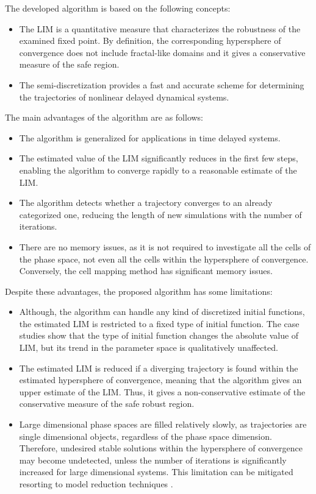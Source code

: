 \documentclass[preprint,12pt]{elsarticle}
\begin{document}
	The developed algorithm is based on the following concepts:  
	\begin{itemize}
		\item The LIM is a quantitative measure that characterizes the robustness of the examined fixed point. By definition, the corresponding hypersphere of convergence does not include fractal-like domains and it gives a conservative  measure of the safe region.
		\item The semi-discretization provides a fast and accurate scheme for determining the trajectories of nonlinear delayed dynamical systems.
	\end{itemize}
	
	The main advantages of the algorithm are as follows:
	\begin{itemize}
		\item The algorithm is generalized for applications in time delayed systems. 
		\item The estimated value of the LIM significantly reduces  in the first few steps, enabling the algorithm to converge rapidly to a reasonable estimate of the LIM.
		\item The algorithm detects whether a trajectory converges to an already categorized one, reducing the length of new simulations with the number of iterations.
		\item There are no memory issues, as it is not required to investigate all the cells of the phase space, not even all the cells within the hypersphere of convergence. Conversely, the cell mapping method has significant memory issues.
	\end{itemize}
	Despite these advantages, the proposed algorithm has some limitations:
	\begin{itemize}
		\item Although, the algorithm can handle any kind of discretized initial functions, the estimated LIM is restricted to a fixed type of initial function.  The case studies show that the type of initial function changes the absolute value of LIM, but its trend in the parameter space is qualitatively unaffected.
		\item The estimated LIM is reduced if a diverging trajectory is found within the estimated hypersphere of convergence, meaning that the algorithm gives an upper estimate of the LIM. Thus, it gives a non-conservative estimate of the conservative measure of the safe robust region.
		\item Large dimensional phase spaces are filled relatively slowly, as trajectories are single dimensional objects, regardless of the phase space dimension. Therefore, undesired stable solutions within the hypersphere of convergence may become undetected, unless the number of iterations is significantly increased for large dimensional systems. This limitation can be mitigated resorting to model reduction techniques \cite{scarciotti2017nonlinear,haller2016nonlinear,chaturantabut2010nonlinear}.
	\end{itemize}
	
\end{document}
